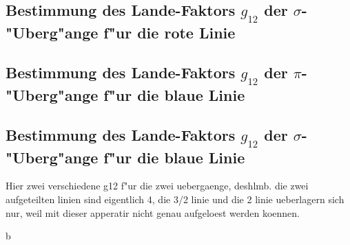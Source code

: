   \subsection{\texorpdfstring{Bestimmung des Lande-Faktors $g_{12}$ der $\sigma$-"Uberg"ange f"ur die rote Linie}{Bestimmung des Lande-Faktors g_{12} der sigma-"Uberg"ange f"ur die rote Linie}}

  \subsection{\texorpdfstring{Bestimmung des Lande-Faktors $g_{12}$ der $\pi$-"Uberg"ange f"ur die blaue Linie}{Bestimmung des Lande-Faktors g_12 der pi-"Uberg"ange f"ur die blaue Linie}}

  \subsection{\texorpdfstring{Bestimmung des Lande-Faktors $g_{12}$ der $\sigma$-"Uberg"ange f"ur die blaue Linie}{Bestimmung des Lande-Faktors g_{12} der sigma-"Uberg"ange f"ur die blaue Linie}}

    Hier zwei verschiedene g12 f"ur die zwei  uebergaenge, deshlmb. die zwei aufgeteilten linien sind eigentlich 4, die 3/2 linie und die 2 linie ueberlagern sich nur, weil mit dieser apperatir nicht genau aufgeloest werden koennen.
























b
